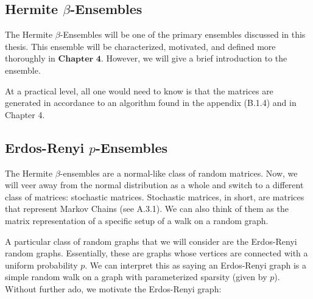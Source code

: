 % 
% 
% 
% 

\subsection{Hermite $\beta$-Ensembles}

The Hermite $\beta$-Ensembles will be one of the primary ensembles discussed in this thesis. This ensemble will be characterized, motivated, and defined more thoroughly in $\textbf{Chapter 4}$. However, we will give a brief introduction to the ensemble.

At a practical level, all one would need to know is that the matrices are generated in accordance to an algorithm found in the appendix (B.1.4) and in Chapter 4. 

\subsection{Erdos-Renyi $p$-Ensembles}

The Hermite $\beta$-ensembles are a normal-like class of random matrices. Now, we will veer away from the normal distribution as a whole and switch to a different class of matrices: stochastic matrices. Stochastic matrices, in short, are matrices that represent Markov Chains (see A.3.1). We can also think of them as the matrix representation of a specific setup of a walk on a random graph. 

A particular class of random graphs that we will consider are the Erdos-Renyi random graphs. Essentially, these are graphs whose vertices are connected with a uniform probability $p$. We can interpret this as saying an Erdos-Renyi graph is a simple random walk on a graph with parameterized sparsity (given by $p$). Without further ado, we motivate the Erdos-Renyi graph:

